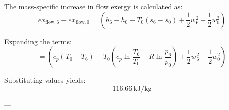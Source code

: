 The mass-specific increase in flow exergy is calculated as:  
\[
ex_{\text{flow},6} - ex_{\text{flow},0} = \left( h_6 - h_0 - T_0 (s_6 - s_0) + \frac{1}{2} w_6^2 - \frac{1}{2} w_0^2 \right)
\]  

Expanding the terms:  
\[
= \left( c_p (T_0 - T_6) - T_0 \left( c_p \ln \frac{T_6}{T_0} - R \ln \frac{p_6}{p_0} \right) + \frac{1}{2} w_6^2 - \frac{1}{2} w_0^2 \right)
\]  

Substituting values yields:  
\[
116.66 \, \text{kJ/kg}
\]  

---